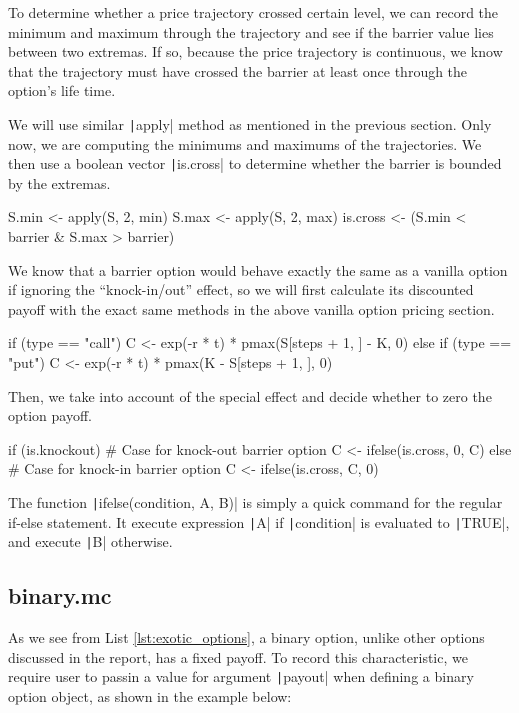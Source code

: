 To determine whether a price trajectory crossed certain level, we can record the minimum and maximum through the trajectory and see if the barrier value lies between two extremas. If so, because the price trajectory is continuous, we know that the trajectory must have crossed the barrier at least once through the option's life time.

We will use similar \texttt|apply| method as mentioned in the previous section. Only now, we are computing the minimums and maximums of the trajectories. We then use a boolean vector \texttt|is.cross| to determine whether the barrier is bounded by the extremas.

\begin{Rminted}
S.min <- apply(S, 2, min)
S.max <- apply(S, 2, max)
is.cross <- (S.min < barrier & S.max > barrier)
\end{Rminted}

We know that a barrier option would behave exactly the same as a vanilla option if ignoring the ``knock-in/out'' effect, so we will first calculate its discounted payoff with the exact same methods in the above vanilla option pricing section.

\begin{Rminted}
if (type == "call") {
    C <- exp(-r * t) * pmax(S[steps + 1, ] - K, 0)
} else if (type == "put") {
    C <- exp(-r * t) * pmax(K - S[steps + 1, ], 0)
}
\end{Rminted}

Then, we take into account of the special effect and decide whether to zero the option payoff.

\begin{Rminted}
if (is.knockout) { # Case for knock-out barrier option
    C <- ifelse(is.cross, 0, C)
} else { # Case for knock-in barrier option
    C <- ifelse(is.cross, C, 0)
}
\end{Rminted}

The function \texttt|ifelse(condition, A, B)| is simply a quick command for the regular if-else statement. It execute expression \texttt|A| if \texttt|condition| is evaluated to \texttt|TRUE|, and execute \texttt|B| otherwise.

\subsection{binary.mc}

As we see from List \ref{lst:exotic_options}, a binary option, unlike other options discussed in the report, has a fixed payoff. To record this characteristic, we require user to passin a value for argument \texttt|payout| when defining a binary option object, as shown in the example below:

